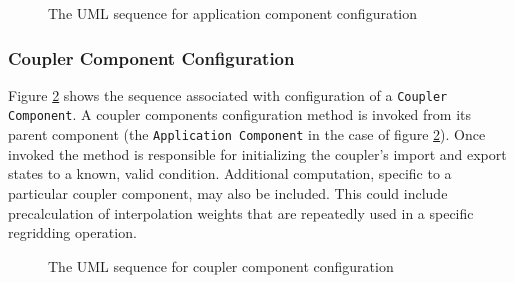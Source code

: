 \begin{figure}
\caption[{Application Component Configuration}]
{The UML sequence for application component configuration}
\begin{center}
\label{fig:ApplicationComponentConfigure}
\end{center}
\end{figure}

\subsubsection{Coupler Component Configuration}
Figure \ref{fig:CouplerComponentConfigure} shows the sequence associated 
with configuration of a {\tt Coupler Component}. A coupler components
configuration method is invoked from its parent
component (the {\tt Application Component} in the case of
figure \ref{fig:CouplerComponentConfigure}). Once invoked the method
is responsible for initializing the coupler's import and export states 
to a known, valid condition. Additional computation, specific to a particular
coupler component, may also be included. This could include precalculation
of interpolation weights that are repeatedly used in a specific regridding
operation.

\begin{figure}
\caption[{Coupler Component Configuration}]
{The UML sequence for coupler component configuration}
\begin{center}
\label{fig:CouplerComponentConfigure}
\end{center}
\end{figure}

